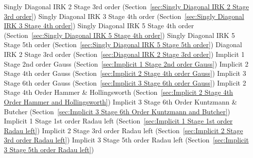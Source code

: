 \begin{list}{}
      \newline 
    Singly Diagonal IRK 2 Stage 3rd order (Section~\ref{sec:Singly Diagonal IRK 2 Stage 3rd order})
      \newline 
    Singly Diagonal IRK 3 Stage 4th order (Section~\ref{sec:Singly Diagonal IRK 3 Stage 4th order})
      \newline 
    Singly Diagonal IRK 5 Stage 4th order (Section~\ref{sec:Singly Diagonal IRK 5 Stage 4th order})
      \newline 
    Singly Diagonal IRK 5 Stage 5th order (Section~\ref{sec:Singly Diagonal IRK 5 Stage 5th order})
      \newline 
    Diagonal IRK 2 Stage 3rd order (Section~\ref{sec:Diagonal IRK 2 Stage 3rd order})
      \newline 
    Implicit 1 Stage 2nd order Gauss (Section~\ref{sec:Implicit 1 Stage 2nd order Gauss})
      \newline 
    Implicit 2 Stage 4th order Gauss (Section~\ref{sec:Implicit 2 Stage 4th order Gauss})
      \newline 
    Implicit 3 Stage 6th order Gauss (Section~\ref{sec:Implicit 3 Stage 6th order Gauss})
      \newline 
    Implicit 2 Stage 4th Order Hammer \& Hollingsworth (Section~\ref{sec:Implicit 2 Stage 4th Order Hammer and Hollingsworth})
      \newline 
    Implicit 3 Stage 6th Order Kuntzmann \& Butcher (Section~\ref{sec:Implicit 3 Stage 6th Order Kuntzmann and Butcher})
      \newline 
    Implicit 1 Stage 1st order Radau left (Section~\ref{sec:Implicit 1 Stage 1st order Radau left})
      \newline 
    Implicit 2 Stage 3rd order Radau left (Section~\ref{sec:Implicit 2 Stage 3rd order Radau left})
      \newline 
    Implicit 3 Stage 5th order Radau left (Section~\ref{sec:Implicit 3 Stage 5th order Radau left})

\end{list}
